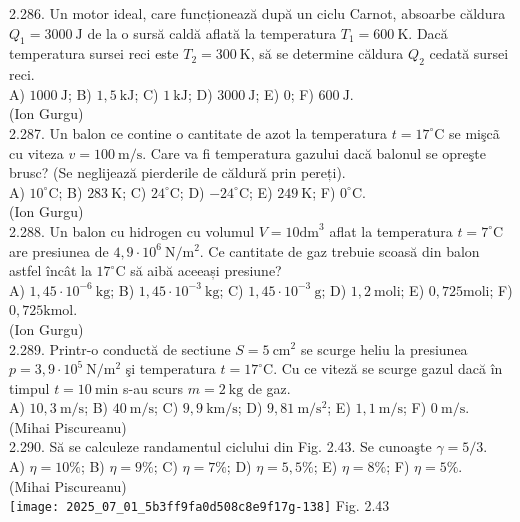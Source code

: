 2.286. Un motor ideal, care funcționează după un ciclu Carnot, absoarbe căldura $Q_{1}=3000 \mathrm{~J}$ de la o sursă caldă aflată la temperatura $T_{1}=600 \mathrm{~K}$. Dacă temperatura sursei reci este $T_{2}=300 \mathrm{~K}$, să se determine căldura $Q_{2}$ cedată sursei reci.\\ A) $1000 \mathrm{~J}$; B) $1,5 \mathrm{~kJ}$; C) $1 \mathrm{~kJ}$; D) $3000 \mathrm{~J}$; E) 0; F) $600 \mathrm{~J}$.\\ (Ion Gurgu)\\

2.287. Un balon ce contine o cantitate de azot la temperatura $t=17^{\circ} \mathrm{C}$ se mişcã cu viteza $v=100 \mathrm{~m} / \mathrm{s}$. Care va fi temperatura gazului dacă balonul se opreşte brusc? (Se neglijează pierderile de căldură prin pereți).\\ A) $10^{\circ} \mathrm{C}$; B) $283 \mathrm{~K}$; C) $24^{\circ} \mathrm{C}$; D) $-24^{\circ} \mathrm{C}$; E) $249 \mathrm{~K}$; F) $0^{\circ} \mathrm{C}$.\\ (Ion Gurgu)\\

2.288. Un balon cu hidrogen cu volumul $V=10 \mathrm{dm}^{3}$ aflat la temperatura $t=7^{\circ} \mathrm{C}$ are presiunea de $4,9 \cdot 10^{6} \mathrm{~N} / \mathrm{m}^{2}$. Ce cantitate de gaz trebuie scoasă din balon astfel încât la $17^{\circ} \mathrm{C}$ să aibă aceeași presiune?\\ A) $1,45 \cdot 10^{-6} \mathrm{~kg}$; B) $1,45 \cdot 10^{-3} \mathrm{~kg}$; C) $1,45 \cdot 10^{-3} \mathrm{~g}$; D) $1,2 \mathrm{~moli}$; E) $0,725 \mathrm{moli}$; F) $0,725 \mathrm{kmol}$.\\ (Ion Gurgu)\\

2.289. Printr-o conductă de sectiune $S=5 \mathrm{~cm}^{2}$ se scurge heliu la presiunea $p=3,9 \cdot 10^{5} \mathrm{~N} / \mathrm{m}^{2}$ şi temperatura $t=17^{\circ} \mathrm{C}$. Cu ce viteză se scurge gazul dacă în timpul $t=10 \mathrm{~min}$ s-au scurs $m=2 \mathrm{~kg}$ de gaz.\\ A) $10,3 \mathrm{~m} / \mathrm{s}$; B) $40 \mathrm{~m} / \mathrm{s}$; C) $9,9 \mathrm{~km} / \mathrm{s}$; D) $9,81 \mathrm{~m} / \mathrm{s}^{2}$; E) $1,1 \mathrm{~m} / \mathrm{s}$; F) $0 \mathrm{~m} / \mathrm{s}$.\\ (Mihai Piscureanu)\\

2.290. Să se calculeze randamentul ciclului din Fig. 2.43. Se cunoaşte $\gamma=5 / 3$.\\ A) $\eta=10 \%$; B) $\eta=9 \%$; C) $\eta=7 \%$; D) $\eta=5,5 \%$; E) $\eta=8 \%$; F) $\eta=5 \%$.\\ (Mihai Piscureanu)\\ \texttt{[image: 2025\_07\_01\_5b3ff9fa0d508c8e9f17g-138]} Fig. 2.43\\

